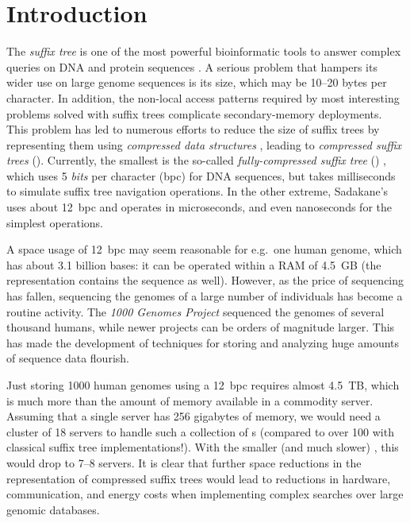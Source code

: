 \section{Introduction}

The \emph{suffix tree} \cite{Weiner1973} is one of the most powerful bioinformatic tools to
answer complex queries on DNA and protein sequences \cite{Gus97,Ohl13,MBCT15}.
A serious problem that hampers its wider use on large genome sequences is its
size, which may be 10--20 bytes per character. In addition, the non-local
access patterns required by most interesting problems solved with suffix trees
complicate secondary-memory deployments. This problem has led to numerous
efforts to reduce the size of suffix trees by representing them using 
\emph{compressed data structures} \cite{Sadakane2007,Fischer2009a,Ohlebusch2009,Ohlebusch2010,Fis10,Russo2011,Gog2011a,GO13b,Abeliuk2013,Navarro2014a,Navarro2015,Ock15,BCGPR15}, 
leading to \emph{compressed suffix trees} (\CST). Currently, the smallest
\CST{} is the so-called \emph{fully-compressed suffix tree} (\FCST)
\cite{Russo2011,Navarro2014a}, which uses 5 \emph{bits} per character (bpc)
for DNA sequences, but takes milliseconds to simulate suffix
tree navigation operations. In the other extreme, Sadakane's \CST{}
\cite{Sadakane2007,Gog2011a} uses about 12~bpc and operates in
microseconds, and even nanoseconds for the simplest operations.

A space usage of 12~bpc may seem reasonable for e.g.\  one human
genome, which has about 3.1 billion bases: it can be operated within a
RAM of 4.5~GB (the representation contains the sequence as well). However,
as the price of sequencing has fallen, sequencing the genomes of a large
number of individuals has become a routine activity. The \emph{1000 Genomes
Project} \cite{1000GP2015} sequenced the genomes of several thousand humans,
while newer projects can be orders of magnitude larger. This has made the
development of techniques for storing and analyzing huge amounts of sequence
data flourish.

Just storing 1000 human genomes using a 12~bpc \CST{} requires almost 4.5~TB, which
is much more than the amount of memory available in a commodity server. Assuming that
a single server has 256 gigabytes of memory, we would need a cluster of 18 servers to
handle such a collection of \CST{}s (compared to over 100 with classical suffix
tree implementations!). With the smaller (and much slower) \FCST, this would
drop to 7--8 servers. It is clear that further space reductions in the
representation of compressed suffix trees would lead to reductions in hardware, communication,
and energy costs when implementing complex searches over large genomic
databases.

